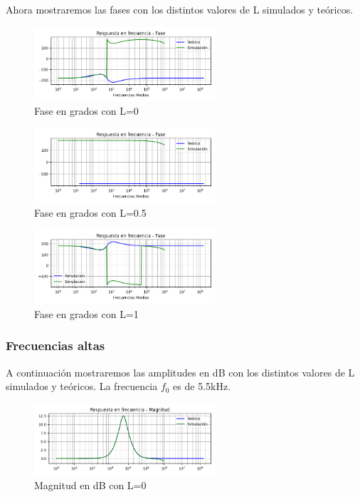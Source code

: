 Ahora mostraremos las fases con los distintos valores de L simulados y teóricos.

\begin{figure}[H]
	\centering
	\includegraphics[width=0.6\textwidth]{../Ejercicio4-EcualizadorDeFase/Informe/medFrecL000Fase.png} 
	\caption{Fase en grados con L=0}
	\label{medFaseL00}
\end{figure}
	
\begin{figure}[H]
	\centering
	\includegraphics[width=0.6\textwidth]{../Ejercicio4-EcualizadorDeFase/Informe/medFrecL050Fase.png} 
	\caption{Fase en grados con L=0.5}
	\label{medFaseL05}
\end{figure}

\begin{figure}[H]
	\centering
	\includegraphics[width=0.6\textwidth]{../Ejercicio4-EcualizadorDeFase/Informe/medFrecL100Fase.png} 
	\caption{Fase en grados con L=1}
	\label{medFaseL10}
\end{figure}

\subsubsection{Frecuencias altas}
A continuación mostraremos las amplitudes en dB con los distintos valores de L simulados y teóricos. La frecuencia $f_0$ es de 5.5kHz.


\begin{figure}[H]
	\centering
	\includegraphics[width=0.6\textwidth]{../Ejercicio4-EcualizadorDeFase/Informe/highFrecL000Mag.png} 
	\caption{Magnitud en dB con L=0}
	\label{highMagL00}
\end{figure}
	

